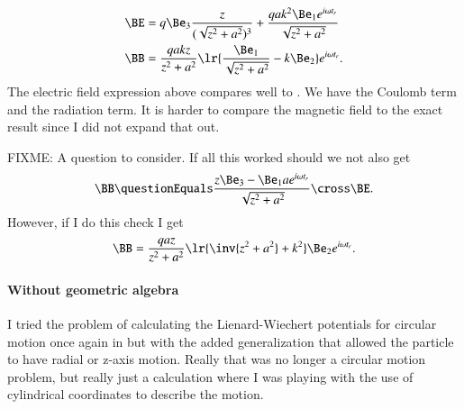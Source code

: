 {\begin{equation}
\begin{aligned}
\BE &=
q \Be_3 \frac{z}{(\sqrt{z^2 + a^2})^3}
+
\frac{q a k^2 \Be_1 e^{i \omega t_r} }{\sqrt{z^2 + a^2}} \\
\BB
&= \frac{q a k z}{ z^2 + a^2} 
\lr{
   \frac{\Be_1}{\sqrt{z^2 + a^2}} - k \Be_2 
} e^{i \omega t_r}.
\end{aligned}
\end{equation}
%
The electric field expression above compares well to .  We have the Coulomb term and the radiation term.  It is harder to compare the magnetic field to the exact result  since I did not expand that out.

FIXME: A question to consider.  If all this worked should we not also get
%
\begin{equation}\label{eqn:relativisticElectrodynamicsExamReflection:270}
\BB
\questionEquals
\frac{z \Be_3 - \Be_1 a e^{i \omega t_r}}{\sqrt{z^2 + a^2}} \cross \BE.
\end{equation}
%
However, if I do this check I get
%
\begin{equation}\label{eqn:relativisticElectrodynamicsExamReflection:290}
\BB
=
\frac{q a z}{z^2 + a^2} 
\lr{
   \inv{z^2 + a^2} + k^2 
}
\Be_2 e^{i \omega t_r}.
\end{equation}
%
%
\paragraph{Without geometric algebra}
%
I tried the problem of calculating the Lienard-Wiechert potentials for circular motion once again in \citep{gabookII:matrixVectorPotentials} but with the added generalization that allowed the particle to have radial or z-axis motion.  Really that was no longer a circular motion problem, but really just a calculation where I was playing with the use of cylindrical coordinates to describe the motion.

}

